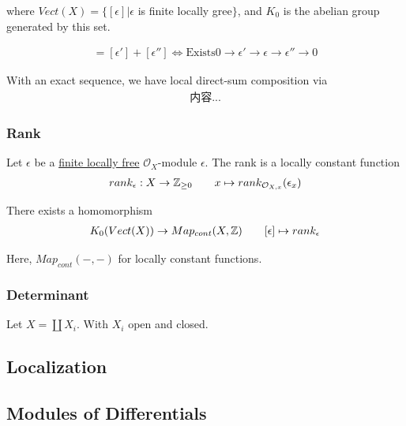 \documentclass[Total.tex]{subfiles}
\begin{document}
					where $Vect(X)=\{[\epsilon]|\epsilon$ is finite locally gree$\}$, and $K_0$ is the abelian group generated by this set. 
					
					\begin{gather*}
						[\epsilon]=[\epsilon']+[\epsilon'']\Leftrightarrow \mbox{Exists} 0\rightarrow\epsilon'\rightarrow \epsilon\rightarrow \epsilon''\rightarrow 0
					\end{gather*}
					
					With an exact sequence, we have local direct-sum composition via
					\begin{gather*}
						内容...
					\end{gather*}
				\subsubsection{Rank}
				
					\begin{Def}
						Let $\epsilon$ be a \underline{finite locally free} $\mathcal{O}_X$-module $\epsilon$. The rank is a locally constant function
						\begin{gather*}
							rank_\epsilon:X\rightarrow \mathbb{Z}_{\geq 0}\qquad x\mapsto rank_{\mathcal{O}_{X,x}}(\epsilon_x)
						\end{gather*}
					\end{Def}
					
					There exists a homomorphism
					\begin{gather*}
						K_0(Vect(X))\rightarrow Map_{cont}(X,\mathbb{Z})\qquad [\epsilon]\mapsto rank_\epsilon
					\end{gather*}
					
					Here, $Map_{cont}(-,-)$ for locally constant functions.
				\subsubsection{Determinant}
					
					\begin{Def}
						Let $X=\coprod X_i$. With $X_i$ open and closed. 
					\end{Def}
			
			\subsection{Localization}
			
			\subsection{Modules of Differentials}
			
\end{document}
